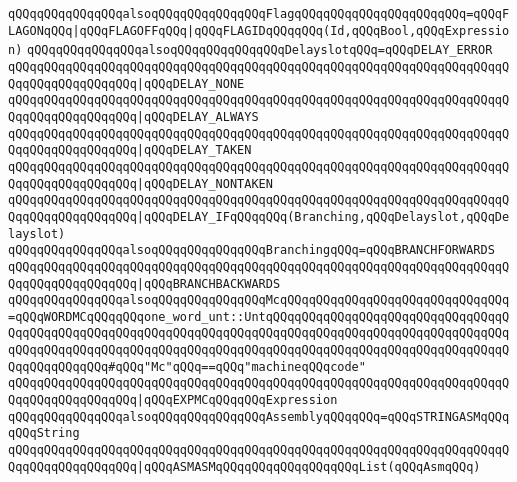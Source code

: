 \verb|qQQqqQQqqQQqqQQqalsoqQQqqQQqqQQqqQQqFlagqQQqqQQqqQQqqQQqqQQqqQQq=qQQqFLAGONqQQq|\verb#|qQQqFLAGOFFqQQq|qQQqFLAGIDqQQqqQQq(Id,qQQqBool,qQQqExpression)#\newline
\newline
\verb|qQQqqQQqqQQqqQQqalsoqQQqqQQqqQQqqQQqDelayslotqQQq=qQQqDELAY_ERROR|\newline
\verb|qQQqqQQqqQQqqQQqqQQqqQQqqQQqqQQqqQQqqQQqqQQqqQQqqQQqqQQqqQQqqQQqqQQqqQQqqQQqqQQqqQQqqQQq|\verb#|qQQqDELAY_NONE#\newline
\verb|qQQqqQQqqQQqqQQqqQQqqQQqqQQqqQQqqQQqqQQqqQQqqQQqqQQqqQQqqQQqqQQqqQQqqQQqqQQqqQQqqQQqqQQq|\verb#|qQQqDELAY_ALWAYS#\newline
\verb|qQQqqQQqqQQqqQQqqQQqqQQqqQQqqQQqqQQqqQQqqQQqqQQqqQQqqQQqqQQqqQQqqQQqqQQqqQQqqQQqqQQqqQQq|\verb#|qQQqDELAY_TAKEN#\newline
\verb|qQQqqQQqqQQqqQQqqQQqqQQqqQQqqQQqqQQqqQQqqQQqqQQqqQQqqQQqqQQqqQQqqQQqqQQqqQQqqQQqqQQqqQQq|\verb#|qQQqDELAY_NONTAKEN#\newline
\verb|qQQqqQQqqQQqqQQqqQQqqQQqqQQqqQQqqQQqqQQqqQQqqQQqqQQqqQQqqQQqqQQqqQQqqQQqqQQqqQQqqQQqqQQq|\verb#|qQQqDELAY_IFqQQqqQQq(Branching,qQQqDelayslot,qQQqDelayslot)#\newline
\newline
\verb|qQQqqQQqqQQqqQQqalsoqQQqqQQqqQQqqQQqBranchingqQQq=qQQqBRANCHFORWARDS|\newline
\verb|qQQqqQQqqQQqqQQqqQQqqQQqqQQqqQQqqQQqqQQqqQQqqQQqqQQqqQQqqQQqqQQqqQQqqQQqqQQqqQQqqQQqqQQq|\verb#|qQQqBRANCHBACKWARDS#\newline
\newline
\verb|qQQqqQQqqQQqqQQqalsoqQQqqQQqqQQqqQQqMcqQQqqQQqqQQqqQQqqQQqqQQqqQQqqQQq=qQQqWORDMCqQQqqQQqone_word_unt::UntqQQqqQQqqQQqqQQqqQQqqQQqqQQqqQQqqQQqqQQqqQQqqQQqqQQqqQQqqQQqqQQqqQQqqQQqqQQqqQQqqQQqqQQqqQQqqQQqqQQqqQQqqQQqqQQqqQQqqQQqqQQqqQQqqQQqqQQqqQQqqQQqqQQqqQQqqQQqqQQqqQQqqQQqqQQqqQQqqQQqqQQqqQQq#qQQq"Mc"qQQq==qQQq"machineqQQqcode"|\newline
\verb|qQQqqQQqqQQqqQQqqQQqqQQqqQQqqQQqqQQqqQQqqQQqqQQqqQQqqQQqqQQqqQQqqQQqqQQqqQQqqQQqqQQqqQQq|\verb#|qQQqEXPMCqQQqqQQqExpression#\newline
\newline
\verb|qQQqqQQqqQQqqQQqalsoqQQqqQQqqQQqqQQqAssemblyqQQqqQQq=qQQqSTRINGASMqQQqqQQqString|\newline
\verb|qQQqqQQqqQQqqQQqqQQqqQQqqQQqqQQqqQQqqQQqqQQqqQQqqQQqqQQqqQQqqQQqqQQqqQQqqQQqqQQqqQQqqQQq|\verb#|qQQqASMASMqQQqqQQqqQQqqQQqqQQqList(qQQqAsmqQQq)#\newline
\newline
